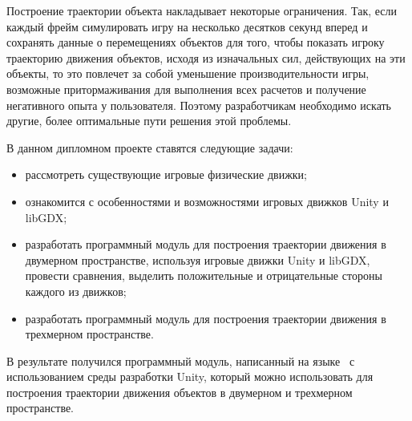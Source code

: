 Построение траектории объекта накладывает некоторые ограничения. Так, если каждый фрейм симулировать игру на несколько десятков секунд вперед и сохранять данные о перемещениях объектов для того, чтобы показать игроку траекторию движения объектов, исходя из изначальных сил, действующих на эти объекты, то это повлечет за собой уменьшение производительности игры, возможные притормаживания для выполнения всех расчетов и получение негативного опыта у пользователя. Поэтому разработчикам необходимо искать другие, более оптимальные пути решения этой проблемы.
 
В данном дипломном проекте ставятся следующие задачи:
\begin{itemize} 
	\item рассмотреть существующие игровые физические движки;
	\item ознакомится с особенностями и возможностями игровых движков Unity и libGDX;
	\item разработать программный модуль для построения траектории движения в двумерном пространстве, используя игровые движки Unity и libGDX, провести сравнения, выделить положительные и отрицательные стороны каждого из движков;
	\item разработать программный модуль для построения траектории движения в трехмерном пространстве.
\end{itemize}

В результате получился программный модуль, написанный на языке \csharp~с использованием среды разработки Unity, который можно использовать для построения траектории движения объектов в двумерном и трехмерном пространстве.
